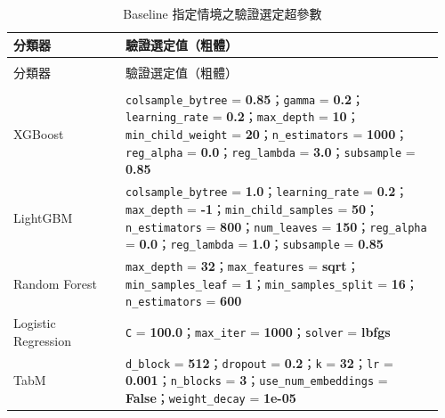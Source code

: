 \begingroup
\footnotesize{}\setlength{\tabcolsep}{3pt}
\setlength{\LTleft}{\fill}\setlength{\LTright}{\fill}
\begin{longtable}{@{}>{\raggedright\arraybackslash}p{0.25\linewidth}>{\raggedright\arraybackslash}p{0.71\linewidth}@{}}
\caption{Baseline 指定情境之驗證選定超參數}\label{tab:validation-selected-parameters}\\
\toprule
分類器 & 驗證選定值（粗體） \\
\midrule\endfirsthead
\multicolumn{2}{c}{表~\thetable（續）}\\
\toprule
分類器 & 驗證選定值（粗體） \\
\midrule\endhead
\midrule\multicolumn{2}{r}{續下頁}\\\endfoot
\bottomrule\endlastfoot
XGBoost & \nolinkurl{colsample_bytree} = \textbf{0.85}；\nolinkurl{gamma} = \textbf{0.2}；\nolinkurl{learning_rate} = \textbf{0.2}；\nolinkurl{max_depth} = \textbf{10}；\nolinkurl{min_child_weight} = \textbf{20}；\nolinkurl{n_estimators} = \textbf{1000}；\nolinkurl{reg_alpha} = \textbf{0.0}；\nolinkurl{reg_lambda} = \textbf{3.0}；\nolinkurl{subsample} = \textbf{0.85} \\
LightGBM & \nolinkurl{colsample_bytree} = \textbf{1.0}；\nolinkurl{learning_rate} = \textbf{0.2}；\nolinkurl{max_depth} = \textbf{-1}；\nolinkurl{min_child_samples} = \textbf{50}；\nolinkurl{n_estimators} = \textbf{800}；\nolinkurl{num_leaves} = \textbf{150}；\nolinkurl{reg_alpha} = \textbf{0.0}；\nolinkurl{reg_lambda} = \textbf{1.0}；\nolinkurl{subsample} = \textbf{0.85} \\
Random Forest & \nolinkurl{max_depth} = \textbf{32}；\nolinkurl{max_features} = \textbf{sqrt}；\nolinkurl{min_samples_leaf} = \textbf{1}；\nolinkurl{min_samples_split} = \textbf{16}；\nolinkurl{n_estimators} = \textbf{600} \\
Logistic Regression & \nolinkurl{C} = \textbf{100.0}；\nolinkurl{max_iter} = \textbf{1000}；\nolinkurl{solver} = \textbf{lbfgs} \\
TabM & \nolinkurl{d_block} = \textbf{512}；\nolinkurl{dropout} = \textbf{0.2}；\nolinkurl{k} = \textbf{32}；\nolinkurl{lr} = \textbf{0.001}；\nolinkurl{n_blocks} = \textbf{3}；\nolinkurl{use_num_embeddings} = \textbf{False}；\nolinkurl{weight_decay} = \textbf{1e-05} \\
\end{longtable}
\endgroup
